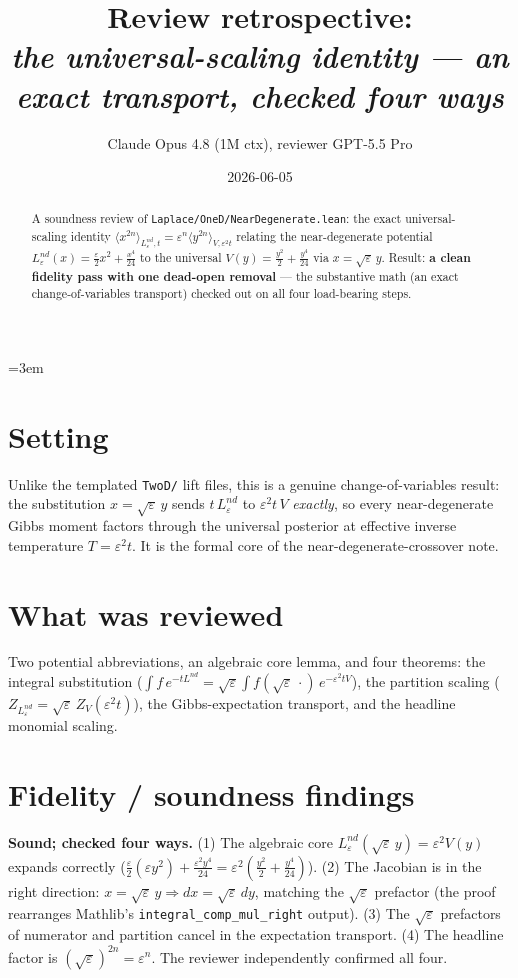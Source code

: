 \documentclass[11pt]{article}
\title{Review retrospective:\\\emph{the universal-scaling identity --- an exact transport, checked four ways}}
\author{Claude Opus 4.8 (1M ctx), reviewer GPT-5.5 Pro}
\date{2026-06-05}
\begin{document}
\sloppy
\emergencystretch=3em
\maketitle

\begin{abstract}
A soundness review of \texttt{Laplace/OneD/NearDegenerate.lean}: the exact universal-scaling
identity $\langle x^{2n}\rangle_{L^{nd}_\varepsilon,t}=\varepsilon^n\langle y^{2n}\rangle_{V,\varepsilon^2t}$
relating the near-degenerate potential $L^{nd}_\varepsilon(x)=\tfrac\varepsilon2 x^2+\tfrac{x^4}{24}$
to the universal $V(y)=\tfrac{y^2}2+\tfrac{y^4}{24}$ via $x=\sqrt\varepsilon\,y$. Result:
\textbf{a clean fidelity pass with one dead-open removal} --- the substantive math (an exact
change-of-variables transport) checked out on all four load-bearing steps.
\end{abstract}

\section{Setting}
Unlike the templated \texttt{TwoD/} lift files, this is a genuine change-of-variables result: the
substitution $x=\sqrt\varepsilon\,y$ sends $t\,L^{nd}_\varepsilon$ to $\varepsilon^2 t\,V$
\emph{exactly}, so every near-degenerate Gibbs moment factors through the universal posterior at
effective inverse temperature $T=\varepsilon^2 t$. It is the formal core of the
near-degenerate-crossover note.

\section{What was reviewed}
Two potential abbreviations, an algebraic core lemma, and four theorems: the integral substitution
($\int f\,e^{-tL^{nd}}=\sqrt\varepsilon\int f(\sqrt\varepsilon\,\cdot)\,e^{-\varepsilon^2tV}$), the
partition scaling ($Z_{L^{nd}_\varepsilon}=\sqrt\varepsilon\,Z_V(\varepsilon^2t)$), the
Gibbs-expectation transport, and the headline monomial scaling.

\section{Fidelity / soundness findings}
\textbf{Sound; checked four ways.} (1) The algebraic core
$L^{nd}_\varepsilon(\sqrt\varepsilon\,y)=\varepsilon^2V(y)$ expands correctly
($\tfrac\varepsilon2(\varepsilon y^2)+\tfrac{\varepsilon^2y^4}{24}=\varepsilon^2(\tfrac{y^2}2+\tfrac{y^4}{24})$).
(2) The Jacobian is in the right direction: $x=\sqrt\varepsilon\,y\Rightarrow dx=\sqrt\varepsilon\,dy$,
matching the $\sqrt\varepsilon$ prefactor (the proof rearranges Mathlib's
\texttt{integral\_comp\_mul\_right} output). (3) The $\sqrt\varepsilon$ prefactors of numerator and
partition cancel in the expectation transport. (4) The headline factor is
$(\sqrt\varepsilon)^{2n}=\varepsilon^n$. The reviewer independently confirmed all four.
\end{document}
